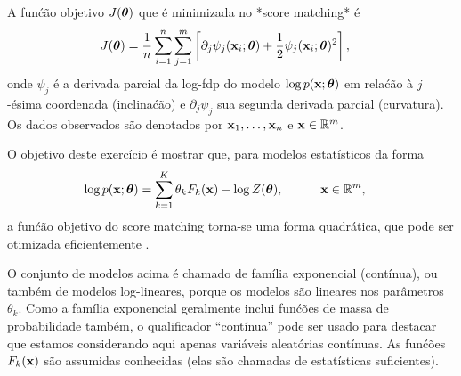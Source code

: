 \label{ex:score-matching-exp-family-alt}
A fun\'c\~ao objetivo $J(\boldsymbol{\theta})$ que \'e minimizada no *score matching* \'e
\begin{align} 
    J(\boldsymbol{\theta}) &= \frac{1}{n} \sum_{i=1}^n \sum_{j=1}^m \left[ \partial_j
    \psi_j(\mathbf{x}_i;\boldsymbol{\theta}) + \frac{1}{2} \psi_j(\mathbf{x}_i;\boldsymbol{\theta})^2 \right],\label{eq:Jsm-def-alt}
\end{align}
onde $\psi_j$ \'e a derivada parcial da log-fdp do modelo $\log
p(\mathbf{x} ;\boldsymbol{\theta})$ em rela\'c\~ao \`a $j$-\'esima coordenada (inclina\'c\~ao) e
$\partial_j \psi_j$ sua segunda derivada parcial (curvatura). Os
dados observados s\~ao denotados por $\mathbf{x}_1,\ldots,\mathbf{x}_n$ e $\mathbf{x} \in
\mathbb{R}^m$.

O objetivo deste exerc\'icio \'e mostrar que, para modelos estat\'isticos da forma
\begin{align}
    \log p(\mathbf{x};\boldsymbol{\theta}) &= \sum_{k=1}^K \theta_k F_k(\mathbf{x}) -\log Z(\boldsymbol{\theta}), \quad \quad \quad \mathbf{x} \in \mathbb{R}^m,
    \label{eq:exp-family-def-alt}
\end{align}
a fun\'c\~ao objetivo do score matching torna-se uma forma quadr\'atica, que pode ser otimizada eficientemente \citep[veja e.g.\ ][Ap\^endice A.5.3]{Barber2012}.

O conjunto de modelos acima \'e chamado de fam\'ilia exponencial (cont\'inua), ou tamb\'em de modelos log-lineares, porque os modelos s\~ao lineares nos
par\^ametros $\theta_k$. Como a fam\'ilia exponencial geralmente inclui
fun\'c\~oes de massa de probabilidade tamb\'em, o qualificador ``cont\'inua'' pode
ser usado para destacar que estamos considerando aqui apenas vari\'aveis aleat\'orias cont\'inuas. As fun\'c\~oes $F_k(\mathbf{x})$ s\~ao assumidas conhecidas (elas
s\~ao chamadas de estat\'isticas suficientes).


